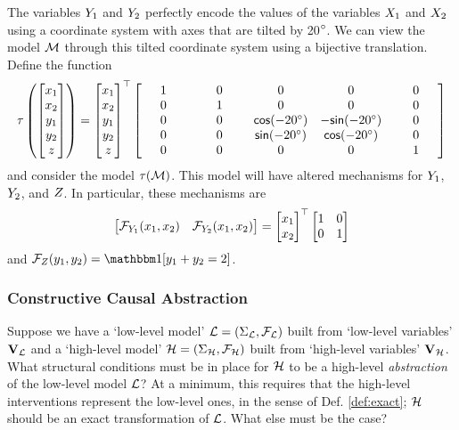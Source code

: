 \documentclass[twoside,11pt]{article}
\begin{document}
\begin{example}
The variables $Y_1$ and $Y_2$ perfectly encode the values of the variables $X_1$ and $X_2$ using a coordinate system with axes that are tilted by 20$\degree$. We can view the model $\mathcal{M}$ through this tilted coordinate system using a bijective translation. Define the function
\[\tau\left(\begin{bmatrix}x_1\\ x_2\\ y_1\\ y_2 \\ z\end{bmatrix}\right) = \begin{bmatrix}x_1\\ x_2\\ y_1\\ y_2 \\ z\end{bmatrix}^\top \begin{bmatrix}\phantom{000}1\phantom{000} & \phantom{000}0\phantom{000} & 0 & 0 & \phantom{000}0\phantom{000}\\ 0 & 1 & 0 & 0 & 0\\ 0 & 0 & \mathsf{cos}(-20\degree) & -\mathsf{sin}(-20\degree) & 0  \\ 0 & 0 & \mathsf{sin}(-20\degree) & \mathsf{cos}(-20\degree) & 0 \\ 0 & 0 & 0 & 0 & 1 \end{bmatrix} \]
and consider the model $\tau(\mathcal{M})$. This model will have altered mechanisms for $Y_1$, $Y_2$, and $Z$. In particular, these mechanisms are
\[\begin{bmatrix}\mathcal{F}_{Y_1}(x_1, x_2) & \mathcal{F}_{Y_2}(x_1, x_2)\end{bmatrix} = \begin{bmatrix} x_1\\ x_2\end{bmatrix}^\top \begin{bmatrix} 1 & 0 \\ 0 & 1 \end{bmatrix} \]
and $\mechanism{\onevarrr}(\onevall_1, \onevall_2) = \indicator{\onevall_1 + \onevall_2 = 2}$. 
\end{example}

\subsubsection{Constructive Causal Abstraction }\label{sec:constructive}
Suppose we have a `low-level model' $\mathcal{L} = (\Sigma_{\mathcal{L}},\mathcal{F}_{\mathcal{L}})$ built from `low-level variables' $\mathbf{V}_{\mathcal{L}}$ and a `high-level model' $\mathcal{H} = (\Sigma_{\mathcal{H}},\mathcal{F}_{\mathcal{H}})$ built from `high-level variables' $\mathbf{V}_{\mathcal{H}}$. 
What structural conditions must be in place for $\mathcal{H}$ to be  a high-level \emph{abstraction} of the low-level model $\mathcal{L}$? 
At a minimum, this requires that the high-level interventions represent the low-level ones, in the sense of Def. \ref{def:exact}; $\mathcal{H}$ should be an exact transformation of $\mathcal{L}$. What else must be the case?
\end{document}
